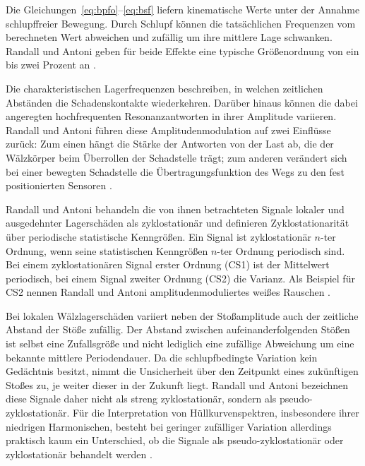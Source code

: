 Die Gleichungen~\eqref{eq:bpfo}--\eqref{eq:bsf} liefern kinematische Werte
unter der Annahme schlupffreier Bewegung. Durch Schlupf können die tatsächlichen
Frequenzen vom berechneten Wert abweichen und zufällig um ihre mittlere Lage
schwanken. Randall und Antoni geben für beide Effekte eine typische Größenordnung
von ein bis zwei Prozent an
\cite[S.~487, Absätze nach Gl.~(4)]
{randallRollingElementBearing2011a}.

\label{par:modulation_zyklostationaeres_signalverhalten}
Die charakteristischen Lagerfrequenzen beschreiben, in welchen zeitlichen Abständen
die Schadenskontakte wiederkehren. Darüber hinaus können die dabei angeregten
hochfrequenten Resonanzantworten in ihrer Amplitude variieren. Randall und Antoni
führen diese Amplitudenmodulation auf zwei Einflüsse zurück: Zum einen hängt die Stärke der
Antworten von der Last ab, die der Wälzkörper beim Überrollen der Schadstelle trägt;
zum anderen verändert sich bei einer bewegten Schadstelle die Übertragungsfunktion
des Wegs zu den fest positionierten Sensoren
\cite[S.~486--487, Abschn.~1 und Abb.~1]{randallRollingElementBearing2011a}.

Randall und Antoni behandeln die von ihnen betrachteten Signale lokaler und
ausgedehnter Lagerschäden als zyklostationär und definieren Zyklostationarität über
periodische statistische Kenngrößen. Ein Signal ist zyklostationär $n$-ter Ordnung,
wenn seine statistischen Kenngrößen $n$-ter Ordnung periodisch sind. Bei einem
zyklostationären Signal erster Ordnung (CS1) ist der Mittelwert periodisch, bei einem
Signal zweiter Ordnung (CS2) die Varianz. Als Beispiel für CS2 nennen Randall und
Antoni amplitudenmoduliertes weißes Rauschen
\cite[S.~490, Abschn.~2]{randallRollingElementBearing2011a}.

Bei lokalen Wälzlagerschäden variiert neben der Stoßamplitude auch der zeitliche
Abstand der Stöße zufällig. Der Abstand zwischen aufeinanderfolgenden Stößen ist
selbst eine Zufallsgröße und nicht lediglich eine zufällige Abweichung um eine
bekannte mittlere Periodendauer. Da die schlupfbedingte Variation kein Gedächtnis
besitzt, nimmt die Unsicherheit über den Zeitpunkt eines zukünftigen Stoßes zu,
je weiter dieser in der Zukunft liegt. Randall und Antoni bezeichnen diese Signale daher nicht als
streng zyklostationär, sondern als pseudo-zyklostationär. Für die
Interpretation von Hüllkurvenspektren, insbesondere ihrer niedrigen Harmonischen,
besteht bei geringer zufälliger Variation allerdings praktisch kaum ein Unterschied,
ob die Signale als pseudo-zyklostationär oder
zyklostationär behandelt werden
\cite[S.~490--491, Abschn.~2.1 und Abb.~4--5]{randallRollingElementBearing2011a}.

